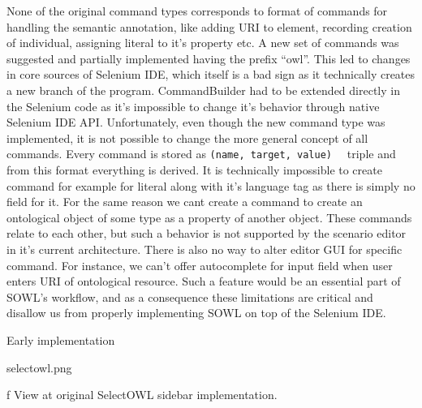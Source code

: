 None of the original command types corresponds to format of commands for
handling the semantic annotation, like adding URI to element, recording
creation of individual, assigning literal to it's property etc. A new set of
commands was suggested and partially implemented having the prefix ``owl''.
This led to changes in core sources of Selenium IDE, which itself is a bad sign
as it technically creates a new branch of the program. CommandBuilder had to be
extended directly in the Selenium code as it's impossible to change it's
behavior through native Selenium IDE API. Unfortunately, even though the new
command type was implemented, it is not possible to change the more general
concept of all commands. Every command is stored as {\tt (name, target, value)
}~ triple and from this format everything is
derived. It is technically impossible to create command for example for literal
along with it's language tag as there is simply no field for it. For the same
reason we cant create a command to create an ontological object of some type as
a property of another object.  These commands relate to each other, but such a
behavior is not supported by the scenario editor in it's current architecture.
There is also no way to alter editor GUI for specific command. For instance, we
can't offer autocomplete for input field when user enters URI of ontological
resource. Such a feature would be an essential part of SOWL's workflow, and as
a consequence these limitations are critical and disallow us from properly
implementing SOWL on top of the Selenium IDE. 


\sec Early implementation



\midinsert
\picw=7cm \cinspic selectowl.png
\caption/f View at original SelectOWL sidebar implementation. 
\endinsert


